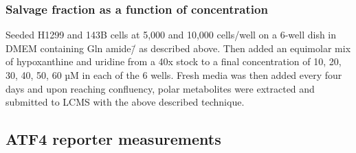 \subsubsection{Salvage fraction as a function of concentration}
Seeded H1299 and 143B cells at 5,000 and 10,000 cells/well on a 6-well dish in DMEM containing Gln amide\=/\hNi{} as described above.
Then added an equimolar mix of hypoxanthine and uridine from a 40x stock to a final concentration of 10, 20, 30, 40, 50, 60 µM in each of the 6 wells.
Fresh media was then added every four days and upon reaching confluency, polar metabolites were extracted and submitted to LCMS with the above described technique.






\subsection{ATF4 reporter measurements}








